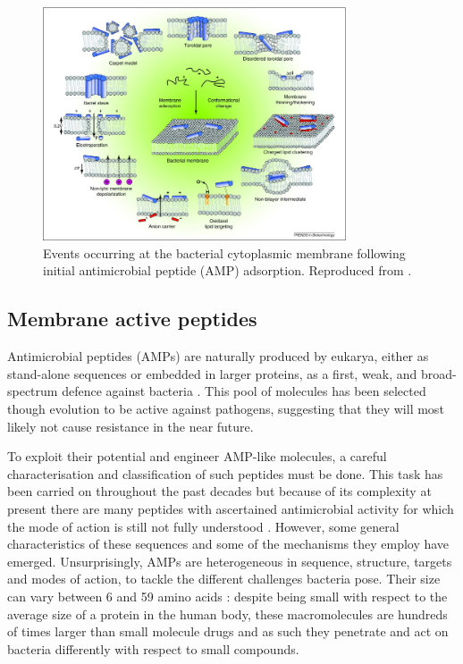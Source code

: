 \begin{figure}
\begin{center}
\includegraphics[width = 0.8\textwidth]{1introduction/pics/amp_mech.jpg}
\caption[Modes of action of antimicrobial peptides]{Events occurring at the bacterial cytoplasmic membrane following initial antimicrobial peptide (AMP) adsorption. Reproduced from \citet{Nguyen2011}.} \label{fig:amp}
\end{center}
\end{figure}


\subsection{Membrane active peptides} \label{sec:host-defense-peptides}
Antimicrobial peptides (AMPs) are naturally produced by eukarya, either as stand-alone sequences or embedded in larger proteins, as a first, weak, and broad-spectrum defence against bacteria \citep{Nguyen2011}.
%
This pool of molecules has been selected though evolution to be active against pathogens, suggesting that they will most likely not cause resistance in the near future.

To exploit their potential and engineer AMP-like molecules, a careful characterisation and classification of such peptides must be done. This task has been carried on throughout the past decades but because of its complexity at present there are many peptides with ascertained antimicrobial activity for which the mode of action is still not fully understood \citep{Ebbensgaard2015}. However, some general characteristics of these sequences and some of the mechanisms they employ have emerged.
%
Unsurprisingly, AMPs are heterogeneous in  sequence, structure, targets and modes of action, to tackle the different challenges bacteria pose. Their size can vary between 6 and 59 amino acids \citep{Brogden2005}: despite being small with respect to the average size of a protein in the human body, these macromolecules are hundreds of times larger than small molecule drugs and as such they penetrate and act on bacteria differently with respect to small compounds.

